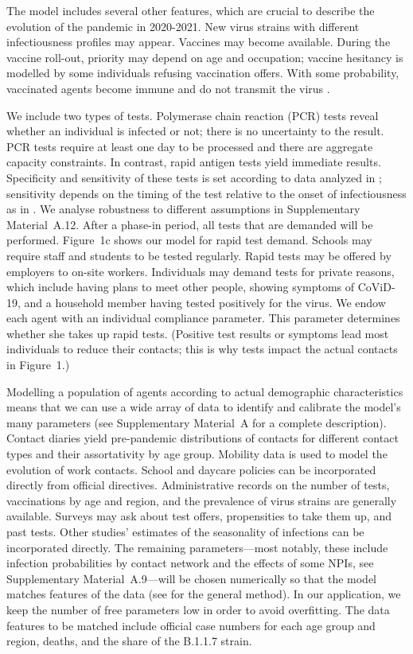 \documentclass[fleqn,10pt]{wlscirep}
\begin{document}
The model includes several other features, which are crucial to describe the evolution
of the pandemic in 2020-2021. New virus strains with different infectiousness profiles
may appear. Vaccines may become available. During the vaccine roll-out, priority may
depend on age and occupation; vaccine hesitancy is modelled by some individuals refusing
vaccination offers. With some probability, vaccinated agents become immune and do not
transmit the virus \cite{Hunter2021, LevineTiefenbrun2021, Petter2021, Pritchard2021}.

We include two types of tests. Polymerase chain reaction (PCR) tests reveal whether an
individual is infected or not; there is no uncertainty to the result. PCR tests require
at least one day to be processed and there are aggregate capacity constraints. In
contrast, rapid antigen tests yield immediate results. Specificity and sensitivity of
these tests is set according to data analyzed in
\cite{Bruemmer2021,Scheiblauer2021,Ozcurumez2021}; sensitivity depends on the timing of
the test relative to the onset of infectiousness as in \cite{Smith2021}. We analyse
robustness to different assumptions in Supplementary Material~A.12. After a phase-in
period, all tests that are demanded will be performed. Figure~1c shows our model for
rapid test demand. Schools may require staff and students to be tested regularly. Rapid
tests may be offered by employers to on-site workers. Individuals may demand tests for
private reasons, which include having plans to meet other people, showing symptoms of
CoViD-19, and a household member having tested positively for the virus. We endow each
agent with an individual compliance parameter. This parameter determines whether she
takes up rapid tests. (Positive test results or symptoms lead most individuals to reduce
their contacts; this is why tests impact the actual contacts in Figure~1.)

Modelling a population of agents according to actual demographic characteristics means
that we can use a wide array of data to identify and calibrate the model's many
parameters (see Supplementary Material~A for a complete description). Contact diaries
yield pre-pandemic distributions of contacts for different contact types and their
assortativity by age group. Mobility data is used to model the evolution of work
contacts. School and daycare policies can be incorporated directly from official
directives. Administrative records on the number of tests, vaccinations by age and
region, and the prevalence of virus strains are generally available. Surveys may ask
about test offers, propensities to take them up, and past tests. Other studies'
estimates of the seasonality of infections can be incorporated directly. The remaining
parameters---most notably, these include infection probabilities by contact network and
the effects of some NPIs, see Supplementary Material~A.9---will be chosen numerically so
that the model matches features of the data (see \cite{McFadden1989} for the general
method). In our application, we keep the number of free parameters low in order to avoid
overfitting. The data features to be matched include official case numbers for each age
group and region, deaths, and the share of the B.1.1.7 strain.
\end{document}
